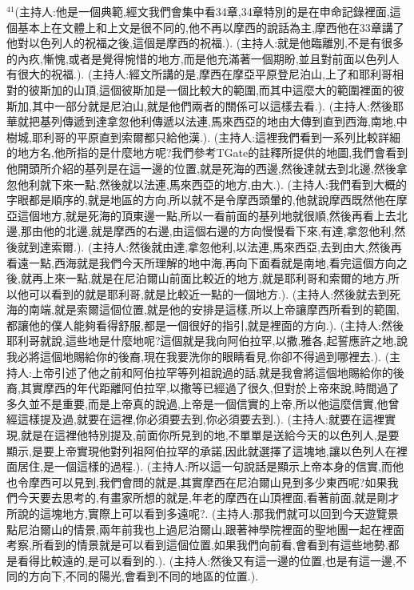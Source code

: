 \documentclass{book}
\begin{document}
$^{41}$(主持人:他是一個典範,經文我們會集中看34章,34章特別的是在申命記錄裡面,這個基本上在文體上和上文是很不同的,他不再以摩西的說話為主,摩西他在33章講了他對以色列人的祝福之後,這個是摩西的祝福.).
(主持人:就是他臨離別,不是有很多的內疚,慚愧,或者是覺得惋惜的地方,而是他充滿著一個期盼,並且對前面以色列人有很大的祝福.).
(主持人:經文所講的是,摩西在摩亞平原登尼泊山,上了和耶利哥相對的彼斯加的山頂,這個彼斯加是一個比較大的範圍,而其中這麼大的範圍裡面的彼斯加,其中一部分就是尼泊山,就是他們兩者的關係可以這樣去看.).
(主持人:然後耶華就把基列傳遞到達拿忽他利傳遞以法連,馬來西亞的地由大傳到直到西海,南地,中樹城,耶利哥的平原直到索爾都只給他漢.).
(主持人:這裡我們看到一系列比較詳細的地方名,他所指的是什麼地方呢?我們參考TGate的註釋所提供的地圖,我們會看到他開頭所介紹的基列是在這一邊的位置,就是死海的西邊,然後達就去到北邊,然後拿忽他利就下來一點,然後就以法連,馬來西亞的地方,由大.).
(主持人:我們看到大概的字眼都是順序的,就是地區的方向,所以就不是令摩西頭暈的,他就說摩西既然他在摩亞這個地方,就是死海的頂東邊一點,所以一看前面的基列地就很順,然後再看上去北邊,那由他的北邊,就是摩西的右邊,由這個右邊的方向慢慢看下來,有達,拿忽他利,然後就到達索爾.).
(主持人:然後就由達,拿忽他利,以法連,馬來西亞,去到由大,然後再看遠一點,西海就是我們今天所理解的地中海,再向下面看就是南地,看完這個方向之後,就再上來一點,就是在尼泊爾山前面比較近的地方,就是耶利哥和索爾的地方,所以他可以看到的就是耶利哥,就是比較近一點的一個地方.).
(主持人:然後就去到死海的南端,就是索爾這個位置,就是他的安排是這樣,所以上帝讓摩西所看到的範圍,都讓他的僕人能夠看得舒服,都是一個很好的指引,就是裡面的方向.).
(主持人:然後耶利哥就說,這些地是什麼地呢?這個就是我向阿伯拉罕,以撒,雅各,起誓應許之地,說我必將這個地賜給你的後裔,現在我要洗你的眼睛看見,你卻不得過到哪裡去.).
(主持人:上帝引述了他之前和阿伯拉罕等列祖說過的話,就是我會將這個地賜給你的後裔,其實摩西的年代距離阿伯拉罕,以撒等已經過了很久,但對於上帝來說,時間過了多久並不是重要,而是上帝真的說過,上帝是一個信實的上帝,所以他這麼信實,他曾經這樣提及過,就要在這裡,你必須要去到,你必須要去到.).
(主持人:就要在這裡實現,就是在這裡他特別提及,前面你所見到的地,不單單是送給今天的以色列人,是要顯示,是要上帝實現他對列祖阿伯拉罕的承諾,因此就選擇了這塊地,讓以色列人在裡面居住,是一個這樣的過程.).
(主持人:所以這一句說話是顯示上帝本身的信實,而他也令摩西可以見到,我們會問的就是,其實摩西在尼泊爾山見到多少東西呢?如果我們今天要去思考的,有畫家所想的就是,年老的摩西在山頂裡面,看著前面,就是剛才所說的這塊地方,實際上可以看到多遠呢?.
(主持人:那我們就可以回到今天遊覽景點尼泊爾山的情景,兩年前我也上過尼泊爾山,跟著神學院裡面的聖地團一起在裡面考察,所看到的情景就是可以看到這個位置,如果我們向前看,會看到有這些地勢,都是看得比較遠的,是可以看到的.).
(主持人:然後又有這一邊的位置,也是有這一邊,不同的方向下,不同的陽光,會看到不同的地區的位置.).
\end{document}
